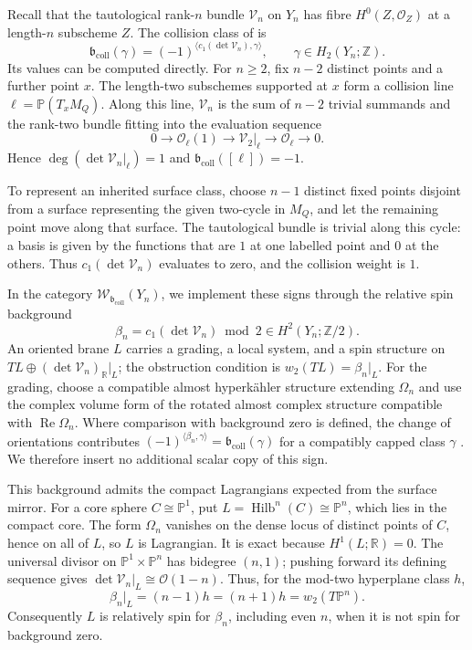 \documentclass[a4paper]{amsart}
\newcommand{\ZZ}{\mathbb{Z}}
\newcommand{\R}{\mathbb{R}}
\newcommand{\PP}{\mathbb{P}}
\DeclareMathOperator{\Ree}{Re}
\numberwithin{equation}{section}
\begin{document}
Recall that the tautological rank-$n$ bundle $\mathcal V_n$ on $Y_n$
has fibre $H^0(Z,\mathcal O_Z)$ at a length-$n$ subscheme $Z$.
The collision class of  is
\[
 \mathfrak b_{\mathrm{coll}}(\gamma)
 =(-1)^{\langle c_1(\det\mathcal V_n),\gamma\rangle},
 \qquad \gamma\in H_2(Y_n;\ZZ).
\]
Its values can be computed directly. For $n\ge2$, fix $n-2$ distinct
points and a further point $x$. The length-two subschemes supported
at $x$ form a collision line $\ell=\PP(T_xM_Q)$. Along this line,
$\mathcal V_n$ is the sum of $n-2$ trivial summands and the rank-two
bundle fitting into the evaluation sequence
\[
 0\longrightarrow\mathcal O_\ell(1)
 \longrightarrow\mathcal V_2|_\ell
 \longrightarrow\mathcal O_\ell\longrightarrow0.
\]
Hence $\deg(\det\mathcal V_n|_\ell)=1$ and
$\mathfrak b_{\mathrm{coll}}([\ell])=-1$.

To represent an inherited surface class, choose $n-1$ distinct fixed
points disjoint from a surface representing the given two-cycle in
$M_Q$, and let the remaining point move along that surface.
The tautological bundle is trivial along this cycle: a basis is given
by the functions that are $1$ at one labelled point and $0$ at the
others. Thus $c_1(\det\mathcal V_n)$ evaluates to zero, and the
collision weight is $1$.

In the category $\mathcal W_{\mathfrak b_{\mathrm{coll}}}(Y_n)$,
we implement these signs through the relative spin background
\[
 \beta_n=c_1(\det\mathcal V_n)\bmod2\in H^2(Y_n;\ZZ/2).
\]
An oriented brane $L$ carries a grading, a local system, and a spin
structure on $TL\oplus(\det\mathcal V_n)_{\R}|_L$; the obstruction
condition is $w_2(TL)=\beta_n|_L$. For the grading, choose a compatible
almost hyperk\"ahler structure extending $\Omega_n$ and use the complex
volume form of the rotated almost complex structure compatible with
$\Ree\Omega_n$. Where comparison with background zero is defined,
the change of orientations contributes
$(-1)^{\langle\beta_n,\gamma\rangle}
=\mathfrak b_{\mathrm{coll}}(\gamma)$ for a compatibly capped class
$\gamma$ \cite[Section~2.2 and Lemma~A.5]{AbouzaidLoops}.
We therefore insert no additional scalar copy of this sign.

This background admits the compact Lagrangians expected from the
surface mirror. For a core sphere $C\cong\PP^1$, put
$L=\operatorname{Hilb}^n(C)\cong\PP^n$, which lies in the compact core.
The form $\Omega_n$ vanishes
on the dense locus of distinct points of $C$, hence on all of $L$,
so $L$ is Lagrangian. It is exact because $H^1(L;\R)=0$.
The universal divisor on $\PP^1\times\PP^n$ has bidegree $(n,1)$;
pushing forward its defining sequence gives
$\det\mathcal V_n|_L\cong\mathcal O(1-n)$. Thus, for the mod-two
hyperplane class $h$,
\[
 \beta_n|_L=(n-1)h=(n+1)h=w_2(T\PP^n).
\]
Consequently $L$ is relatively spin for $\beta_n$, including even $n$,
when it is not spin for background zero.
\end{document}
